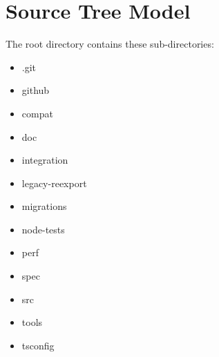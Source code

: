 \section{Source Tree Model}

The root directory contains these sub-directories:

\begin{itemize}
  \item .git
  \item github
  \item compat
  \item doc
  \item integration
  \item legacy-reexport
  \item migrations
  \item node-tests
  \item perf
  \item spec
  \item src
  \item tools
  \item tsconfig
\end{itemize}




